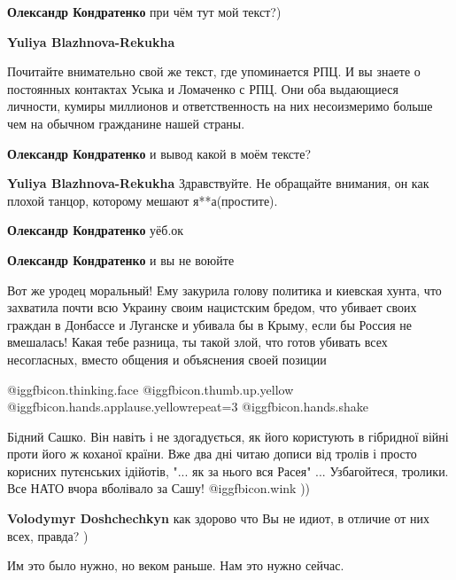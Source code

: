 \begin{itemize}
\begin{itemize}
\textbf{Олександр Кондратенко} при чём тут мой текст?)

\textbf{Yuliya Blazhnova-Rekukha} 

Почитайте внимательно свой же текст, где упоминается РПЦ. И вы знаете о
постоянных контактах Усыка и Ломаченко с РПЦ. Они оба выдающиеся личности,
кумиры миллионов и ответственность на них несоизмеримо больше чем на обычном
гражданине нашей страны.

\textbf{Олександр Кондратенко} и вывод какой в моём тексте?

\textbf{Yuliya Blazhnova-Rekukha} Здравствуйте. Не обращайте внимания, он как плохой танцор, которому мешают я**а(простите).

\textbf{Олександр Кондратенко} уёб.ок

\textbf{Олександр Кондратенко} и вы не воюйте


Вот же уродец моральный! Ему закурила голову политика и киевская хунта, что
захватила почти всю Украину своим нацистским бредом, что убивает своих граждан
в Донбассе и Луганске и убивала бы в Крыму, если бы Россия не вмешалась! Какая
тебе разница, ты такой злой, что готов убивать всех несогласных, вместо общения
и объяснения своей позиции

\end{itemize} %

 @igg{fbicon.thinking.face}  @igg{fbicon.thumb.up.yellow}  @igg{fbicon.hands.applause.yellow}{repeat=3}  @igg{fbicon.hands.shake} 


Бідний Сашко. Він навіть і не здогадується, як його користують в гібридної
війні проти його ж коханої країни. Вже два дні читаю дописи від тролів і просто
корисних путєнських ідійотів, "... як за нього вся Расея" ... Узбагойтеся,
тролики. Все НАТО вчора вболівало за Сашу!  @igg{fbicon.wink}  ))

\begin{itemize} %
\textbf{Volodymyr Doshchechkyn} как здорово что Вы не идиот, в отличие от них всех, правда? )
\end{itemize} %

Им это было нужно, но веком раньше. Нам это нужно сейчас.



\end{itemize}

